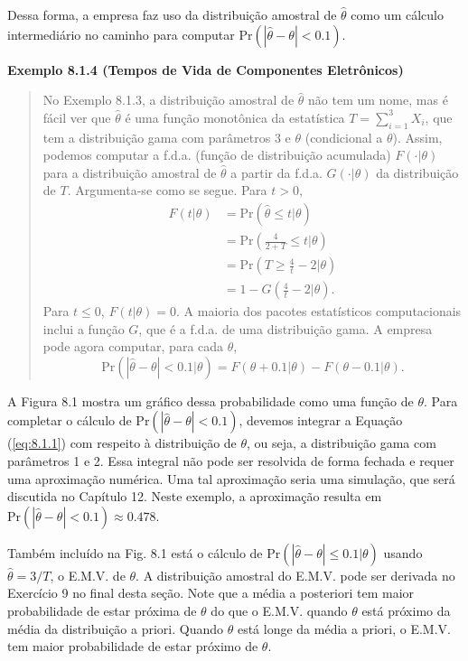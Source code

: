 Dessa forma, a empresa faz uso da distribuição amostral de $\hat{\theta}$ como um cálculo intermediário no caminho para computar $\text{Pr}(|\hat{\theta} - \theta| < 0.1)$.

\vspace{1em}
\noindent\textbf{Exemplo 8.1.4 (Tempos de Vida de Componentes Eletrônicos)}
\begin{quote}
    No Exemplo 8.1.3, a distribuição amostral de $\hat{\theta}$ não tem um nome, mas é fácil ver que $\hat{\theta}$ é uma função monotônica da estatística $T = \sum_{i=1}^3 X_i$, que tem a distribuição gama com parâmetros 3 e $\theta$ (condicional a $\theta$). Assim, podemos computar a f.d.a. (função de distribuição acumulada) $F(\cdot|\theta)$ para a distribuição amostral de $\hat{\theta}$ a partir da f.d.a. $G(\cdot|\theta)$ da distribuição de $T$. Argumenta-se como se segue. Para $t > 0$,
    \begin{align*}
        F(t|\theta) &= \text{Pr}(\hat{\theta} \le t | \theta) \\
        &= \text{Pr}\left(\frac{4}{2+T} \le t \bigg| \theta\right) \\
        &= \text{Pr}\left(T \ge \frac{4}{t} - 2 \bigg| \theta\right) \\
        &= 1 - G\left(\frac{4}{t} - 2 \bigg| \theta\right).
    \end{align*}
    Para $t \le 0$, $F(t|\theta) = 0$. A maioria dos pacotes estatísticos computacionais inclui a função $G$, que é a f.d.a. de uma distribuição gama. A empresa pode agora computar, para cada $\theta$,
    \begin{equation} \label{eq:8.1.1}
        \text{Pr}(|\hat{\theta} - \theta| < 0.1 | \theta) = F(\theta+0.1|\theta) - F(\theta-0.1|\theta).
    \end{equation}
\end{quote}
\vspace{1em}

A Figura 8.1 mostra um gráfico dessa probabilidade como uma função de $\theta$. Para completar o cálculo de $\text{Pr}(|\hat{\theta} - \theta| < 0.1)$, devemos integrar a Equação (\ref{eq:8.1.1}) com respeito à distribuição de $\theta$, ou seja, a distribuição gama com parâmetros 1 e 2. Essa integral não pode ser resolvida de forma fechada e requer uma aproximação numérica. Uma tal aproximação seria uma simulação, que será discutida no Capítulo 12. Neste exemplo, a aproximação resulta em $\text{Pr}(|\hat{\theta}-\theta| < 0.1) \approx 0.478$.

Também incluído na Fig. 8.1 está o cálculo de $\text{Pr}(|\hat{\theta} - \theta| \le 0.1 | \theta)$ usando $\hat{\theta}=3/T$, o E.M.V. de $\theta$. A distribuição amostral do E.M.V. pode ser derivada no Exercício 9 no final desta seção. Note que a média a posteriori tem maior probabilidade de estar próxima de $\theta$ do que o E.M.V. quando $\theta$ está próximo da média da distribuição a priori. Quando $\theta$ está longe da média a priori, o E.M.V. tem maior probabilidade de estar próximo de $\theta$.

